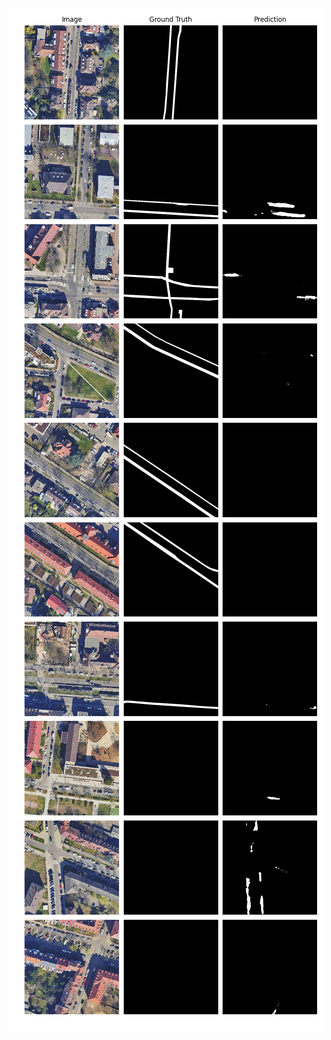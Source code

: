 	\begin{figure}
	\centering
	\begin{subfigure}{.4\textwidth}
		\centering
		\includegraphics[width=1.\textwidth]{Bilder/Samples-KA/bunet15-l.png} 

\end{subfigure}
\end{figure}
